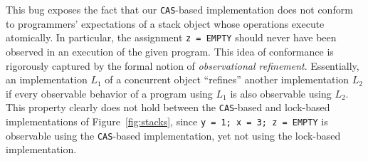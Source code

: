 This bug exposes the fact that our {\tt CAS}-based implementation does not
conform to programmers' expectations of a stack object whose operations execute
atomically. In particular, the assignment {\tt z = EMPTY} should never have
been observed in an execution of the given program. This idea of conformance is
rigorously captured by the formal notion of \emph{observational refinement}.
Essentially, an implementation $L_1$ of a concurrent object ``refines'' another
implementation $L_2$ if every observable behavior of a program using $L_1$ is
also observable using $L_2$. This property clearly does not hold between the
{\tt CAS}-based and lock-based implementations of Figure~\ref{fig:stacks},
since {\tt y = 1; x = 3; z = EMPTY} is observable using the {\tt CAS}-based
implementation, yet not using the lock-based implementation.
